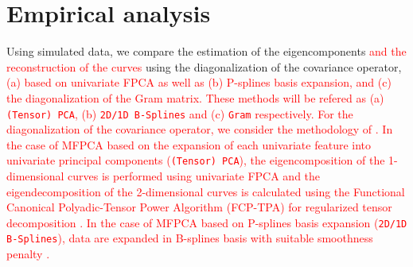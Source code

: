 \section{Empirical analysis} %
\label{sec:empirical_analysis}


Using simulated data, we compare the estimation of the eigencomponents \textcolor{red}{and the reconstruction of the curves} using the diagonalization of the covariance operator, \textcolor{red}{(a) based on univariate FPCA as well as (b) P-splines basis expansion, and (c) the diagonalization of the Gram matrix. These methods will be refered as (a) \texttt{(Tensor) PCA}, (b) \texttt{2D/1D B-Splines} and (c) \texttt{Gram} respectively. For the diagonalization of the covariance operator, we consider the methodology of \cite{happMultivariateFunctionalPrincipal2018a}. In the case of MFPCA based on the expansion of each univariate feature into univariate principal components (\texttt{(Tensor) PCA}), the eigencomposition of the 1-dimensional curves is performed using univariate FPCA and the eigendecomposition of the 2-dimensional curves is calculated using the Functional Canonical Polyadic-Tensor Power Algorithm (FCP-TPA) for regularized tensor decomposition \citep{allenMultiwayFunctionalPrincipal2013a}. In the case of MFPCA based on P-splines basis expansion (\texttt{2D/1D B-Splines}), data are expanded in B-splines basis with suitable smoothness penalty \citep{eilersFlexibleSmoothingBsplines1996}.}

